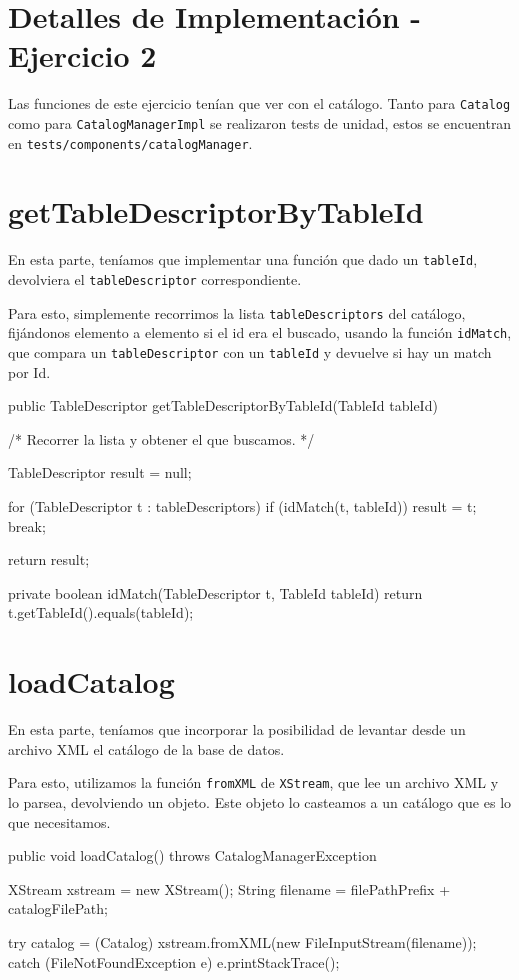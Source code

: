\section{Detalles de Implementaci\'on - Ejercicio 2}

Las funciones de este ejercicio tenían que ver con el catálogo.
Tanto para \texttt{Catalog} como para \texttt{CatalogManagerImpl}
se realizaron tests de unidad, estos se encuentran en 
\texttt{tests/components/catalogManager}.


\section{getTableDescriptorByTableId}

En esta parte, teníamos que implementar una función que dado un
\texttt{tableId}, devolviera el \texttt{tableDescriptor} correspondiente.


Para esto, simplemente recorrimos la lista \texttt{tableDescriptors}
del catálogo, fijándonos elemento a elemento si el id era el buscado,
usando la función \texttt{idMatch}, que compara un \texttt{tableDescriptor}
con un \texttt{tableId} y devuelve si hay un match por Id.

\begin{verbatimtab}[4]
public TableDescriptor getTableDescriptorByTableId(TableId tableId)
{		
	/* Recorrer la lista y obtener el que buscamos. */
	
	TableDescriptor result = null;		
	
	for (TableDescriptor t : tableDescriptors)
	{
		if (idMatch(t, tableId))
		{
			result = t;
			break;
		}
	}
	
	return result;
}

private boolean idMatch(TableDescriptor t, TableId tableId)
{
	return t.getTableId().equals(tableId);
}
\end{verbatimtab}

\newpage
\section{loadCatalog}

En esta parte, teníamos que incorporar la posibilidad de levantar desde un archivo
XML el catálogo de la base de datos.

Para esto, utilizamos la función \texttt{fromXML} de \texttt{XStream}, que lee
un archivo XML y lo parsea, devolviendo un objeto.
Este objeto lo casteamos a un catálogo que es lo que necesitamos.

\begin{verbatimtab}[4]
public void loadCatalog() throws CatalogManagerException
{
	XStream xstream = new XStream();			
	String filename = filePathPrefix + catalogFilePath;
	
	try 
	{
		catalog = (Catalog) xstream.fromXML(new FileInputStream(filename));
	} 
	catch (FileNotFoundException e) 
	{
		e.printStackTrace();
	}		
}
\end{verbatimtab}